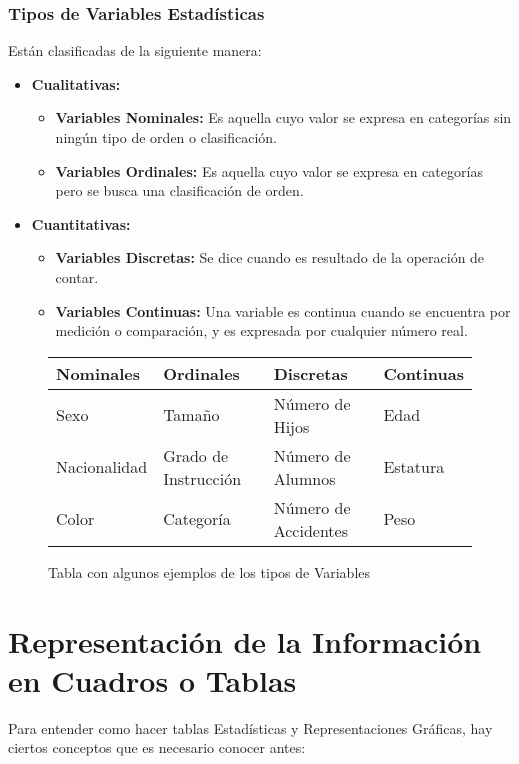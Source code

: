 \subsubsection{Tipos de Variables Estadísticas}
Están clasificadas de la siguiente manera:
\begin{itemize}
\item \textbf{Cualitativas:}
\begin{itemize}
\item \textbf{Variables Nominales:} Es aquella cuyo valor se expresa en categorías sin ningún tipo de orden o clasificación.
\item \textbf{Variables Ordinales:} Es aquella cuyo valor se expresa en categorías pero se busca una clasificación de orden.
\end{itemize}
\item \textbf{Cuantitativas:}
\begin{itemize}
\item \textbf{Variables Discretas:} Se dice cuando es resultado de la operación de contar.
\item \textbf{Variables Continuas:} Una variable es continua cuando se encuentra por medición o comparación, y es expresada por cualquier número real. 
\end{itemize}
\end{itemize}

\begin{figure}[h]
\begin{tabular}{|p{3.5cm}|p{3.5cm}|p{3.5cm}|p{3.5cm}|}
\hline 
\textbf{Nominales} & \textbf{Ordinales} & \textbf{Discretas} & \textbf{Continuas} \\ 
\hline 
Sexo & Tamaño & Número de Hijos & Edad \\ 
\hline 
Nacionalidad & Grado de Instrucción  & Número de Alumnos & Estatura \\ 
\hline 
Color & Categoría  & Número de Accidentes & Peso \\ 
\hline 
\end{tabular} 
\caption{Tabla con algunos ejemplos de los tipos de Variables}
\end{figure}

\section{Representación de la Información en Cuadros o Tablas}
Para entender como hacer tablas Estadísticas y Representaciones Gráficas, hay ciertos conceptos que es necesario conocer antes:
